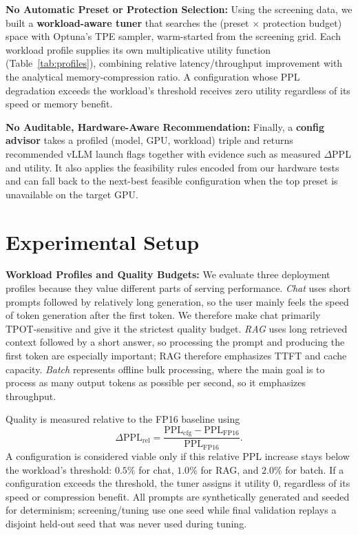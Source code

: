 \documentclass[10pt]{article}
\begin{document}
\textbf{No Automatic Preset or Protection Selection:} Using the screening data, we built a \textbf{workload-aware tuner} that searches the (preset $\times$ protection budget) space with Optuna's TPE sampler, warm-started from the screening grid. Each workload profile supplies its own multiplicative utility function (Table~\ref{tab:profiles}), combining relative latency/throughput improvement with the analytical memory-compression ratio. A configuration whose PPL degradation exceeds the workload's threshold receives zero utility regardless of its speed or memory benefit.

\textbf{No Auditable, Hardware-Aware Recommendation:} Finally, a \textbf{config advisor} takes a profiled (model, GPU, workload) triple and returns recommended vLLM launch flags together with evidence such as measured $\Delta$PPL and utility. It also applies the feasibility rules encoded from our hardware tests and can fall back to the next-best feasible configuration when the top preset is unavailable on the target GPU.

\section{Experimental Setup}
\label{sec:expsetup}

\textbf{Workload Profiles and Quality Budgets:}
We evaluate three deployment profiles because they value different parts of serving performance. \emph{Chat} uses short prompts followed by relatively long generation, so the user mainly feels the speed of token generation after the first token. We therefore make chat primarily TPOT-sensitive and give it the strictest quality budget. \emph{RAG} uses long retrieved context followed by a short answer, so processing the prompt and producing the first token are especially important; RAG therefore emphasizes TTFT and cache capacity. \emph{Batch} represents offline bulk processing, where the main goal is to process as many output tokens as possible per second, so it emphasizes throughput.

Quality is measured relative to the FP16 baseline using
\[
\Delta\mathrm{PPL}_{\mathrm{rel}}
=
\frac{\mathrm{PPL}_{\mathrm{cfg}}-\mathrm{PPL}_{\mathrm{FP16}}}
     {\mathrm{PPL}_{\mathrm{FP16}}}.
\]
A configuration is considered viable only if this relative PPL increase stays below the workload's threshold: $0.5\%$ for chat, $1.0\%$ for RAG, and $2.0\%$ for batch. If a configuration exceeds the threshold, the tuner assigns it utility $0$, regardless of its speed or compression benefit. All prompts are synthetically generated and seeded for determinism; screening/tuning use one seed while final validation replays a disjoint held-out seed that was never used during tuning.
\end{document}

